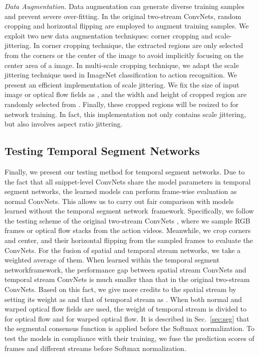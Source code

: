 \documentclass[runningheads]{llncs}
\newcommand{\SEGNET}{temporal segment network}
\begin{document}
\textit{Data Augmentation.} 
Data augmentation can generate diverse training samples and prevent severe over-fitting. In the original two-stream ConvNets, random cropping and horizontal flipping are employed to augment training samples. We exploit two new data augmentation techniques: corner cropping and scale-jittering. In corner cropping technique, the extracted regions are only selected from the corners or the center of the image to avoid implicitly focusing on the center area of a image. In multi-scale cropping technique, we adapt the scale jittering technique \cite{SimonyanZ14a} used in ImageNet classification to action recognition. We present an efficient implementation of scale jittering. We fix the size of input image or optical flow fields as , and the width and height of cropped region are randomly selected from . Finally, these cropped regions will be resized to  for network training. In fact, this implementation not only contains scale jittering, but also involves aspect ratio jittering.

\subsection{Testing Temporal Segment Networks}

Finally, we present our testing method for \SEGNET s. 
Due to the fact that all snippet-level ConvNets share the model parameters in \SEGNET s, the learned models can perform frame-wise evaluation as normal ConvNets.
This allows us to carry out fair comparison with models learned without the \SEGNET~framework. 
Specifically, we follow the testing scheme of the original two-stream ConvNets \cite{SimonyanZ14}, where we sample  RGB frames or optical flow stacks from the action videos. Meanwhile, we crop  corners and  center, and their horizontal flipping from the sampled frames to evaluate the ConvNets.  
For the fusion of spatial and temporal stream networks, we take a weighted average of them. 
When learned within the \SEGNET framework, the performance gap between spatial stream ConvNets and temporal stream ConvNets is much smaller than that in the original two-stream ConvNets.
Based on this fact, we give more credits to the spatial stream by setting its weight as  and that of temporal stream as .
When both normal and warped optical flow fields are used, the weight of temporal stream is divided to  for optical flow and  for warped optical flow.
It is described in Sec.~\ref{sec:seg} that the segmental consensus function is applied before the Softmax normalization.
To test the models in compliance with their training, we fuse the prediction scores of  frames and different streams before Softmax normalization.
\end{document}
